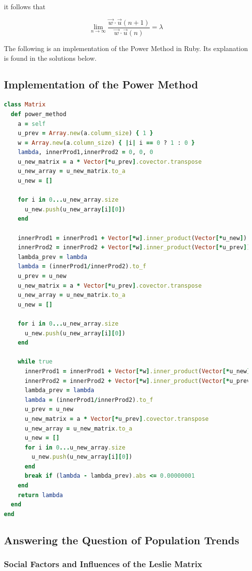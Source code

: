 \documentclass[letterpaper,12pt]{article}
\begin{document}
it follows that

\[\lim_{n\to\infty} \frac{{\vec{w}} \cdot {\vec{u}(n+1)}}{ {\vec{w}} \cdot {\vec{u}(n)}} =\lambda\]

The following is an implementation of the Power Method in Ruby.
Its explanation is found in the solutions below.

\subsection{Implementation of the Power Method}
\lstset{caption=Power Method}
\begin{lstlisting}[language=ruby]
class Matrix
  def power_method
    a = self
    u_prev = Array.new(a.column_size) { 1 }
    w = Array.new(a.column_size) { |i| i == 0 ? 1 : 0 }
    lambda, innerProd1,innerProd2 = 0, 0, 0
    u_new_matrix = a * Vector[*u_prev].covector.transpose
    u_new_array = u_new_matrix.to_a
    u_new = []

    for i in 0...u_new_array.size
      u_new.push(u_new_array[i][0])
    end

    innerProd1 = innerProd1 + Vector[*w].inner_product(Vector[*u_new])
    innerProd2 = innerProd2 + Vector[*w].inner_product(Vector[*u_prev])
    lambda_prev = lambda
    lambda = (innerProd1/innerProd2).to_f
    u_prev = u_new
    u_new_matrix = a * Vector[*u_prev].covector.transpose
    u_new_array = u_new_matrix.to_a
    u_new = []

    for i in 0...u_new_array.size
      u_new.push(u_new_array[i][0])
    end

    while true
      innerProd1 = innerProd1 + Vector[*w].inner_product(Vector[*u_new])
      innerProd2 = innerProd2 + Vector[*w].inner_product(Vector[*u_prev])
      lambda_prev = lambda
      lambda = (innerProd1/innerProd2).to_f
      u_prev = u_new
      u_new_matrix = a * Vector[*u_prev].covector.transpose
      u_new_array = u_new_matrix.to_a
      u_new = []
      for i in 0...u_new_array.size
        u_new.push(u_new_array[i][0])
      end
      break if (lambda - lambda_prev).abs <= 0.00000001
    end
    return lambda
  end
end
\end{lstlisting}

\subsection{Answering the Question of Population Trends}

\subsubsection{Social Factors and Influences of the Leslie Matrix}
\end{document}

